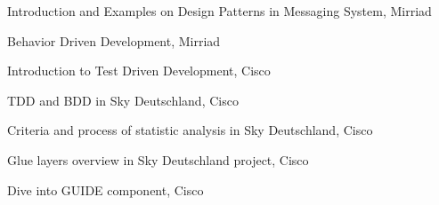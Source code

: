 \begin{cventries}
  \cventryS
    {
        \begin{cvitems}
        \item {Introduction and Examples on Design Patterns in Messaging System, Mirriad}
        \item {Behavior Driven Development, Mirriad}
        \item {Introduction to Test Driven Development, Cisco}
        \item {TDD and BDD in Sky Deutschland, Cisco}
        \item {Criteria and process of statistic analysis in Sky Deutschland, Cisco}
        \item {Glue layers overview in Sky Deutschland project, Cisco}
        \item {Dive into GUIDE component, Cisco}
        \end{cvitems}
    }
\end{cventries}
